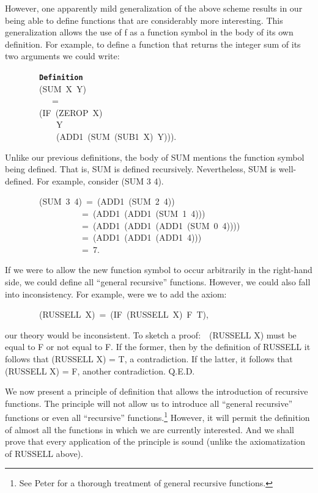 \documentclass[11pt]{book}
\newenvironment{pubasis}{\begin{flushleft}\ttfamily\small}{\normalsize\rmfamily\end{flushleft}}
\newcommand{\axiomordefinition}[1]{\vspace{6pt}\texttt{\textbf{#1}}}
\begin{document}
However, one apparently mild generalization of the above scheme results
in our being able to define functions that are considerably more
interesting.  This generalization  allows  the use of f as a 
function symbol in the body of its own definition.
For example, to define a function that returns the integer sum of
its two arguments we could write:
\begin{pubasis}
~~~~~~~~\axiomordefinition{Definition}\\
~~~~~~~~(SUM~X~Y)\\
~~~~~~~~~~~=~\\
~~~~~~~~(IF~(ZEROP~X)\\
~~~~~~~~~~~~Y\\
~~~~~~~~~~~~(ADD1~(SUM~(SUB1~X)~Y))).\\
\end{pubasis}
Unlike our previous definitions, the body of SUM mentions the 
function symbol being defined.  That is, SUM is defined recursively.
Nevertheless, SUM is well-defined.  For example, consider (SUM 3 4).
\begin{pubasis}
~~~~~~~~(SUM~3~4)~=~(ADD1~(SUM~2~4))\\
~~~~~~~~~~~~~~~~~~=~(ADD1~(ADD1~(SUM~1~4)))\\
~~~~~~~~~~~~~~~~~~=~(ADD1~(ADD1~(ADD1~(SUM~0~4))))\\
~~~~~~~~~~~~~~~~~~=~(ADD1~(ADD1~(ADD1~4)))\\
~~~~~~~~~~~~~~~~~~=~7.\\
\end{pubasis}
If we were to allow the new function symbol to occur arbitrarily
in the right-hand side, we could define  all
``general recursive''
functions.  However, we could also fall into inconsistency.
For example, were we to add the axiom:
\begin{pubasis}
~~~~~~~~(RUSSELL~X)~=~(IF~(RUSSELL~X)~F~T),\\
\end{pubasis}
our theory would be inconsistent.  To sketch a proof:~~(RUSSELL X) must be
equal to F or not equal to F.  If the former, then by the definition of RUSSELL
it follows that (RUSSELL X) = T, a contradiction.
If the latter, it follows that
(RUSSELL X) = F, another contradiction.
Q.E.D.

We now present  a principle of definition that allows
the introduction of  recursive functions.  The principle will not allow
us to introduce  all ``general recursive'' functions or even all ``recursive''
functions.\footnote{See Peter \cite{PETER} for a thorough treatment of general recursive functions.}  However, it will permit the definition of
almost  all  the functions in which we are currently
interested.  And we shall prove that every application of
the principle is sound (unlike the axiomatization of RUSSELL above).
\end{document}
